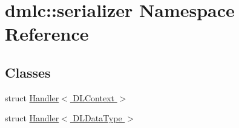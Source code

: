 \hypertarget{namespacedmlc_1_1serializer}{}\section{dmlc\+:\+:serializer Namespace Reference}
\label{namespacedmlc_1_1serializer}
\subsection*{Classes}
\begin{DoxyCompactItemize}
\item 
struct \hyperlink{structdmlc_1_1serializer_1_1Handler_3_01DLContext_01_4}{Handler$<$ D\+L\+Context $>$}
\item 
struct \hyperlink{structdmlc_1_1serializer_1_1Handler_3_01DLDataType_01_4}{Handler$<$ D\+L\+Data\+Type $>$}
\end{DoxyCompactItemize}
